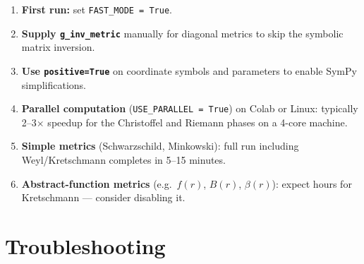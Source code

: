 \documentclass[11pt,a4paper]{article}
\newcommand{\code}[1]{\texttt{\small#1}}
\begin{document}
\begin{enumerate}
  \item \textbf{First run:} set \code{FAST\_MODE = True}.
  \item \textbf{Supply \code{g\_inv\_metric}} manually for diagonal metrics to
        skip the symbolic matrix inversion.
  \item \textbf{Use \code{positive=True}} on coordinate symbols and parameters
        to enable SymPy simplifications.
  \item \textbf{Parallel computation} (\code{USE\_PARALLEL = True}) on
        Colab or Linux: typically 2--3$\times$ speedup for the Christoffel
        and Riemann phases on a 4-core machine.
  \item \textbf{Simple metrics} (Schwarzschild, Minkowski): full run including
        Weyl/Kretschmann completes in 5--15 minutes.
  \item \textbf{Abstract-function metrics} (e.g.\ $f(r)$, $B(r)$, $\beta(r)$):
        expect hours for Kretschmann — consider disabling it.
\end{enumerate}

\section{Troubleshooting}
\label{sec:trouble}
\end{document}
